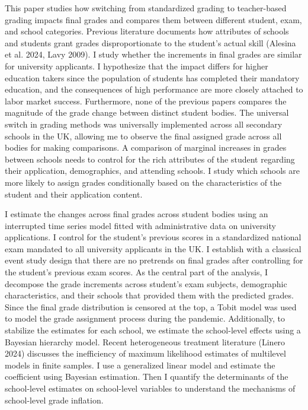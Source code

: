 This paper studies how switching from standardized grading to teacher-based grading impacts final grades and compares them between different student, exam, and school categories. Previous literature documents how attributes of schools and students grant grades disproportionate to the student's actual skill (Alesina et al. 2024, Lavy 2009). I study whether the increments in final grades are similar for university applicants. I hypothesize that the impact differs for higher education takers since the population of students has completed their mandatory education, and the consequences of high performance are more closely attached to labor market success. Furthermore, none of the previous papers compares the magnitude of the grade change between distinct student bodies. The universal switch in grading methods was universally implemented across all secondary schools in the UK, allowing me to observe the final assigned grade across all bodies for making comparisons. A comparison of marginal increases in grades between schools needs to control for the rich attributes of the student regarding their application, demographics, and attending schools. I study which schools are more likely to assign grades conditionally based on the characteristics of the student and their application content. 

I estimate the changes across final grades across student bodies using an interrupted time series model fitted with administrative data on university applications. I control for the student's previous scores in a standardized national exam mandated to all university applicants in the UK. I establish with a classical event study design that there are no pretrends on final grades after controlling for the student's previous exam scores. As the central part of the analysis, I decompose the grade increments across student's exam subjects, demographic characteristics, and their schools that provided them with the predicted grades. Since the final grade distribution is censored at the top, a Tobit model was used to model the grade assignment process during the pandemic. Additionally, to stabilize the estimates for each school, we estimate the school-level effects using a Bayesian hierarchy model. Recent heterogeneous treatment literature (Linero 2024) discusses the inefficiency of maximum likelihood estimates of multilevel models in finite samples. I use a generalized linear model and estimate the coefficient using Bayesian estimation. Then I quantify the determinants of the school-level estimates on school-level variables to understand the mechanisms of school-level grade inflation. 

